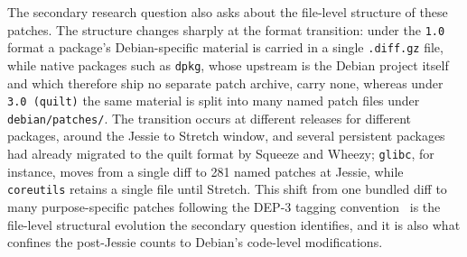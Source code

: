 The secondary research question also asks about the file-level structure of these patches. The structure changes sharply at the format transition: under the \texttt{1.0} format a package's Debian-specific material is carried in a single \texttt{.diff.gz} file, while native packages such as \texttt{dpkg}, whose upstream is the Debian project itself and which therefore ship no separate patch archive, carry none, whereas under \texttt{3.0 (quilt)} the same material is split into many named patch files under \texttt{debian/patches/}. The transition occurs at different releases for different packages, around the Jessie to Stretch window, and several persistent packages had already migrated to the quilt format by Squeeze and Wheezy; \texttt{glibc}, for instance, moves from a single diff to 281 named patches at Jessie, while \texttt{coreutils} retains a single file until Stretch. This shift from one bundled diff to many purpose-specific patches following the DEP-3 tagging convention~\cite{dep3} is the file-level structural evolution the secondary question identifies, and it is also what confines the post-Jessie counts to Debian's code-level modifications.
